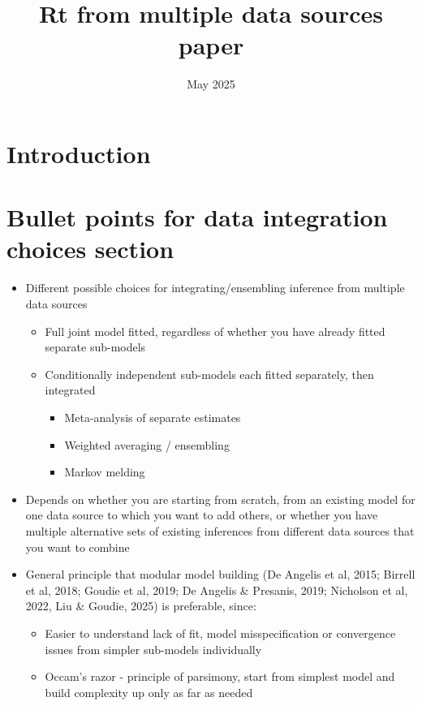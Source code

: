 \documentclass{article}
\title{Rt from multiple data sources paper}
\author{}
\date{May 2025}
\begin{document}
\maketitle

\section{Introduction}



\section{Bullet points for data integration choices section}

\begin{itemize}
    \item Different possible choices for integrating/ensembling inference from multiple data sources
    \begin{itemize}
        \item Full joint model fitted, regardless of whether you have already fitted separate sub-models
        \item Conditionally independent sub-models each fitted separately, then integrated
        \begin{itemize}
            \item Meta-analysis of separate estimates
            \item Weighted averaging / ensembling
            \item Markov melding
        \end{itemize}
    \end{itemize}
    \item Depends on whether you are starting from scratch, from an existing model for one data source to which you want to add others, or whether you have multiple alternative sets of existing inferences from different data sources that you want to combine
    \item General principle that modular model building (De Angelis et al, 2015; Birrell et al, 2018; Goudie et al, 2019; De Angelis \& Presanis, 2019; Nicholson et al, 2022, Liu \& Goudie, 2025) is preferable, since:
    \begin{itemize}
        \item Easier to understand lack of fit, model misspecification or convergence issues from simpler sub-models individually
        \item Occam’s razor - principle of parsimony, start from simplest model and build complexity up only as far as needed

\end{itemize}
\end{itemize}
\end{document}
